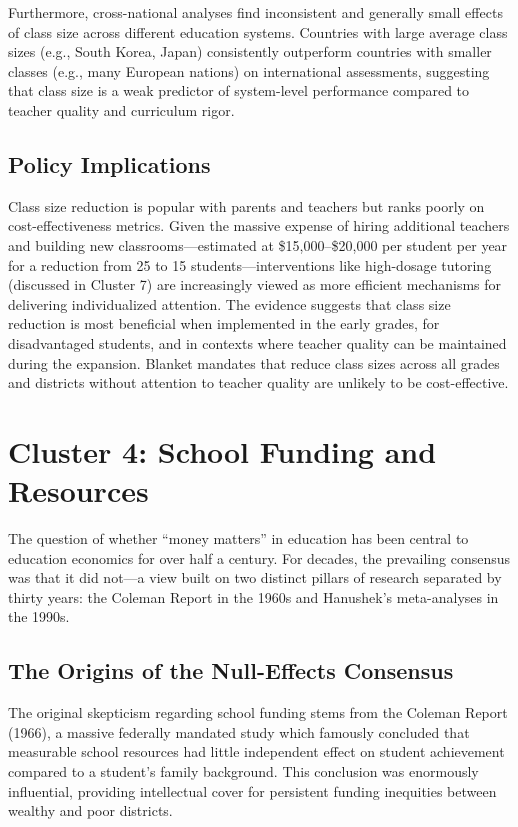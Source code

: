 \documentclass[12pt,letterpaper]{article}
\begin{document}
Furthermore, cross-national analyses \citep{wossmann2006} find inconsistent and generally small effects of class size across different education systems. Countries with large average class sizes (e.g., South Korea, Japan) consistently outperform countries with smaller classes (e.g., many European nations) on international assessments, suggesting that class size is a weak predictor of system-level performance compared to teacher quality and curriculum rigor.

\subsection{Policy Implications}

Class size reduction is popular with parents and teachers but ranks poorly on cost-effectiveness metrics. Given the massive expense of hiring additional teachers and building new classrooms---estimated at \$15,000--\$20,000 per student per year for a reduction from 25 to 15 students---interventions like high-dosage tutoring (discussed in Cluster 7) are increasingly viewed as more efficient mechanisms for delivering individualized attention. The evidence suggests that class size reduction is most beneficial when implemented in the early grades, for disadvantaged students, and in contexts where teacher quality can be maintained during the expansion. Blanket mandates that reduce class sizes across all grades and districts without attention to teacher quality are unlikely to be cost-effective.

\section{Cluster 4: School Funding and Resources}

The question of whether ``money matters'' in education has been central to education economics for over half a century. For decades, the prevailing consensus was that it did not---a view built on two distinct pillars of research separated by thirty years: the Coleman Report in the 1960s and Hanushek's meta-analyses in the 1990s.

\subsection{The Origins of the Null-Effects Consensus}
The original skepticism regarding school funding stems from the Coleman Report (1966), a massive federally mandated study which famously concluded that measurable school resources had little independent effect on student achievement compared to a student's family background. This conclusion was enormously influential, providing intellectual cover for persistent funding inequities between wealthy and poor districts. 
\end{document}
